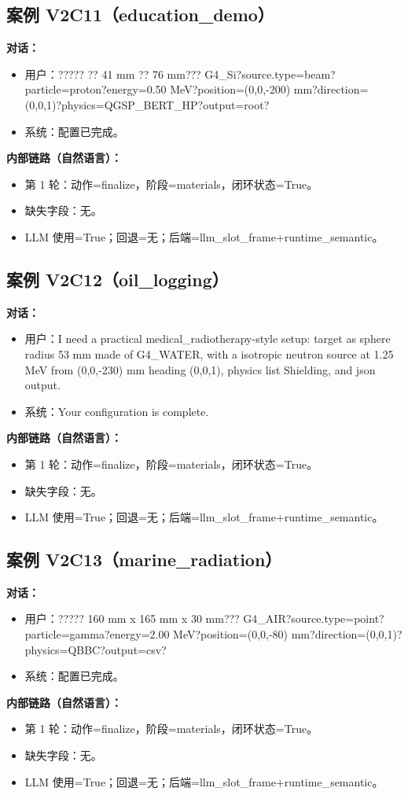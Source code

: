 \documentclass[11pt]{ctexart}
\begin{document}
\subsection{案例 V2C11（education\_demo）}
\textbf{对话：}
\begin{itemize}
\item 用户：????? ?? 41 mm ?? 76 mm??? G4\_Si?source.type=beam?particle=proton?energy=0.50 MeV?position=(0,0,-200) mm?direction=(0,0,1)?physics=QGSP\_BERT\_HP?output=root?
\item 系统：配置已完成。
\end{itemize}
\textbf{内部链路（自然语言）：}
\begin{itemize}
\item 第 1 轮：动作=finalize，阶段=materials，闭环状态=True。
\item 缺失字段：无。
\item LLM 使用=True；回退=无；后端=llm\_slot\_frame+runtime\_semantic。
\end{itemize}
\subsection{案例 V2C12（oil\_logging）}
\textbf{对话：}
\begin{itemize}
\item 用户：I need a practical medical\_radiotherapy-style setup: target as sphere radius 53 mm made of G4\_WATER, with a isotropic neutron source at 1.25 MeV from (0,0,-230) mm heading (0,0,1), physics list Shielding, and json output.
\item 系统：Your configuration is complete.
\end{itemize}
\textbf{内部链路（自然语言）：}
\begin{itemize}
\item 第 1 轮：动作=finalize，阶段=materials，闭环状态=True。
\item 缺失字段：无。
\item LLM 使用=True；回退=无；后端=llm\_slot\_frame+runtime\_semantic。
\end{itemize}
\subsection{案例 V2C13（marine\_radiation）}
\textbf{对话：}
\begin{itemize}
\item 用户：????? 160 mm x 165 mm x 30 mm??? G4\_AIR?source.type=point?particle=gamma?energy=2.00 MeV?position=(0,0,-80) mm?direction=(0,0,1)?physics=QBBC?output=csv?
\item 系统：配置已完成。
\end{itemize}
\textbf{内部链路（自然语言）：}
\begin{itemize}
\item 第 1 轮：动作=finalize，阶段=materials，闭环状态=True。
\item 缺失字段：无。
\item LLM 使用=True；回退=无；后端=llm\_slot\_frame+runtime\_semantic。
\end{itemize}
\end{document}
